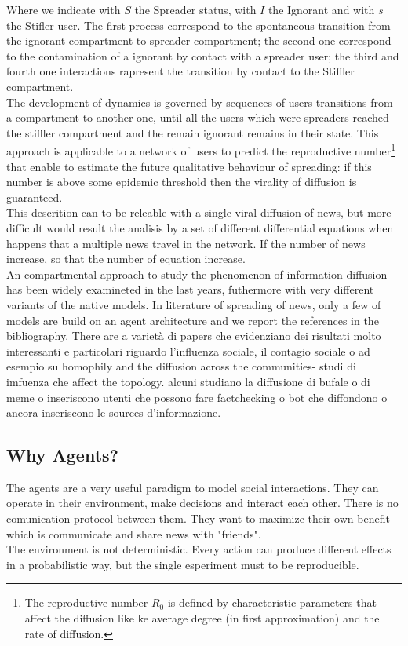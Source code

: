 \documentclass[11pt]{article} %
\begin{document}
Where we indicate with $S$ the Spreader status, with $I$ the Ignorant and with $s$ the Stifler user. The first process correspond to the spontaneous transition from the ignorant compartment to spreader compartment; the second one correspond to the contamination of a ignorant by contact with a spreader user; the third and fourth one interactions rapresent the transition by contact to the Stiffler compartment.  \\
The development of dynamics is governed by sequences of users transitions from a compartment to another one, until all the users which were spreaders reached the stiffler compartment and the remain ignorant remains in their state.
This approach is applicable to a network of users to predict the reproductive number\footnote{The reproductive number $R_{0}$ is defined by characteristic parameters that affect the diffusion like ke average degree (in first approximation) and the rate of diffusion. } that enable to estimate the future qualitative behaviour of spreading: if this number is above some epidemic threshold then the virality of diffusion is guaranteed.\\
This descrition can to be releable with a single viral diffusion of news, but more difficult would result the analisis by a set of different differential equations when happens that a multiple news travel in the network. If the number of news increase, so that the number of equation increase.\\
 An compartmental approach to study the phenomenon of information diffusion has been widely examineted in the last years, futhermore with very different variants of the native models.
 In literature of spreading of news, only a few of models are build on an agent architecture and we report the references in the bibliography.
There are a varietà di papers che evidenziano dei risultati molto interessanti e particolari riguardo l'influenza sociale, il contagio sociale o ad esempio su homophily and the diffusion across the communities- studi di imfuenza che affect the topology. alcuni studiano la diffusione di bufale o di meme o inseriscono utenti che possono fare factchecking o bot che diffondono o ancora inseriscono le sources d'informazione.

\subsection{Why Agents?}
The agents are a very useful paradigm to model social interactions. 
They can operate in their environment, make decisions and interact each other.
There is no comunication protocol between them. They want to maximize their own benefit which is
communicate and share news with "friends". \\
The environment is not deterministic. Every action can produce different effects in a probabilistic
way, but the single esperiment must to be reproducible.
\end{document}
